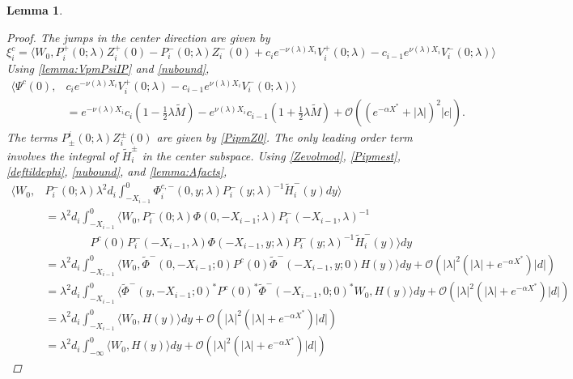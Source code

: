 \documentclass[10pt,reqno]{amsart}
\theoremstyle{plain}
\newtheorem{lemma}[theorem]{Lemma}
\theoremstyle{definition}
\theoremstyle{remark}
\numberwithin{theorem}{section}
\numberwithin{equation}{section}
\begin{document}
\begin{lemma}
\begin{proof}
The jumps in the center direction are given by
\[
\xi_i^c = 
\langle W_0, P_i^+(0; \lambda) Z_i^+(0) - P_i^-(0; \lambda) Z_i^-(0) + c_i e^{-\nu(\lambda)X_i}V_i^+(0; \lambda) - c_{i-1} e^{\nu(\lambda)X_i} V_i^-(0; \lambda) \rangle 
\]
Using \cref{lemma:VpmPsiIP} and \cref{nubound},
\begin{align*}
\langle \Psi^c(0), &c_i e^{-\nu(\lambda)X_i}V_i^+(0; \lambda) - c_{i-1} e^{\nu(\lambda)X_i} V_i^-(0; \lambda) \rangle \\
&= e^{-\nu(\lambda)X_i}c_i\left( 1 - \frac{1}{2}\lambda \tilde{M} \right) 
- e^{\nu(\lambda)X_i}c_{i-1}\left( 1 + \frac{1}{2}\lambda \tilde{M} \right) + \mathcal{O}\left( (e^{-\alpha X^*} +|\lambda|)^2 |c|\right).
\end{align*}
The terms $P^i_\pm(0; \lambda) Z_i^\pm(0)$ are given by \cref{PipmZ0}. The only leading order term involves the integral of $\tilde{H}_i^\pm$ in the center subspace. Using \cref{Zevolmod}, \cref{Pipmest}, \cref{deftildephi}, \cref{nubound}, and \cref{lemma:Afacts},
\begin{equation*}
\begin{aligned}
\langle W_0, &P_i^-(0; \lambda) \lambda^2 d_i \int_{-X_{i-1}}^0 \Phi_i^{c,-}(0, y; \lambda) P_i^-(y; \lambda)^{-1} \tilde{H}_i^-(y) dy \rangle \\
&= \lambda^2 d_i \int_{-X_{i-1}}^0 \langle W_0, P_i^-(0; \lambda) \Phi(0, -X_{i-1}; \lambda) P_i^-(-X_{i-1}, \lambda)^{-1} \\
&\qquad \qquad
P^c(0) P_i^-(-X_{i-1}, \lambda) \Phi(-X_{i-1}, y; \lambda) P_i^-(y; \lambda)^{-1} \tilde{H}_i^-(y) \rangle dy \\
&= \lambda^2 d_i \int_{-X_{i-1}}^0 \langle W_0, \tilde{\Phi}^-(0, -X_{i-1}; 0) 
P^c(0) \tilde{\Phi}^-(-X_{i-1}, y; 0) H(y) \rangle dy + \mathcal{O}(|\lambda|^2 (|\lambda| + e^{- \alpha X^*}) |d|) \\
&= \lambda^2 d_i \int_{-X_{i-1}}^0 \langle \tilde{\Phi}^-(y, -X_{i-1}; 0)^* P^c(0)^* \tilde{\Phi}^-(-X_{i-1}, 0; 0)^* W_0,
 H(y) \rangle dy + \mathcal{O}(|\lambda|^2 (|\lambda| + e^{- \alpha X^*}) |d|) \\
&= \lambda^2 d_i \int_{-X_{i-1}}^0 \langle W_0, H(y) \rangle dy + \mathcal{O}(|\lambda|^2 (|\lambda| + e^{- \alpha X^*}) |d|) \\
&= \lambda^2 d_i \int_{-\infty}^0 \langle W_0, H(y) \rangle dy + \mathcal{O}(|\lambda|^2 (|\lambda| + e^{- \alpha X^*}) |d|)
\end{aligned}
\end{equation*}

\end{proof}
\end{lemma}
\end{document}
